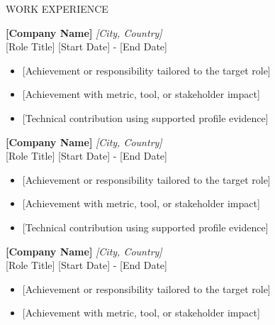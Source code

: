 \documentclass{resume} %
\begin{document}
\begin{rSection}{WORK EXPERIENCE}

 \textbf{[Company Name]} \hfill \textit{[City, Country]}\\
{[Role Title]} \hfill [Start Date] - [End Date]

\vspace{-3pt}
\begin{itemize}
 \itemsep -4pt {}
 \item{} [Achievement or responsibility tailored to the target role]
 \item{} [Achievement with metric, tool, or stakeholder impact]
 \item{} [Technical contribution using supported profile evidence]
 \end{itemize}


 \textbf{[Company Name]} \hfill \textit{[City, Country]}\\
{[Role Title]} \hfill [Start Date] - [End Date]

\vspace{-3pt}
\begin{itemize}
 \itemsep -4pt {}
\item{} [Achievement or responsibility tailored to the target role]
\item{} [Achievement with metric, tool, or stakeholder impact]
\item{} [Technical contribution using supported profile evidence]
 \end{itemize}

\textbf{[Company Name]} \hfill \textit{[City, Country]}\\
{[Role Title]} \hfill [Start Date] - [End Date]

\vspace{-3pt}
 \begin{itemize}
 \itemsep -4pt {}
     \item{} [Achievement or responsibility tailored to the target role]
     \item{} [Achievement with metric, tool, or stakeholder impact]
 \end{itemize}


\end{rSection}

\end{document}
